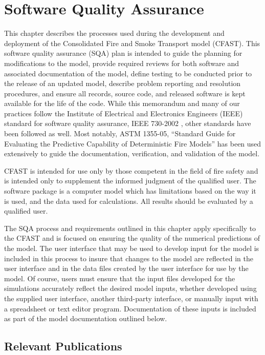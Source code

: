 
\chapter{Software Quality Assurance}

This chapter describes the processes used during the development and deployment of the Consolidated Fire and Smoke Transport model (CFAST).  This software quality assurance (SQA) plan is intended to guide the planning for modifications to the model, provide required reviews for both software and associated documentation of the model, define testing to be conducted prior to the release of an updated model, describe problem reporting and resolution procedures, and ensure all records, source code, and released software is kept available for the life of the code.  While this memorandum and many of our practices follow the Institute of Electrical and Electronics Engineers (IEEE) standard for software quality assurance, IEEE 730-2002 \cite{IEEE:730}, other standards have been followed as well.  Most notably, ASTM 1355-05, ``Standard Guide for Evaluating the Predictive Capability of Deterministic Fire Models'' \cite{ASTM:E1355} has been used extensively to guide the documentation, verification, and validation of the model.

CFAST is intended for use only by those competent in the field of fire safety and is intended only to supplement the informed judgment of the qualified user. The software package is a computer model which has limitations based on the way it is used, and the data used for calculations. All results should be evaluated by a qualified user.

The SQA process and requirements outlined in this chapter apply specifically to the CFAST and is focused on ensuring the quality of the numerical predictions of the model.  The user interface that may be used to develop input for the model is included in this process to insure that changes to the model are reflected in the user interface and in the data files created by the user interface for use by the model.  Of course, users must ensure that the input files developed for the simulations accurately reflect the desired model inputs, whether developed using the supplied user interface, another third-party interface, or manually input with a spreadsheet or text editor program.  Documentation of these inputs is included as part of the model documentation outlined below.

\section{Relevant Publications}

